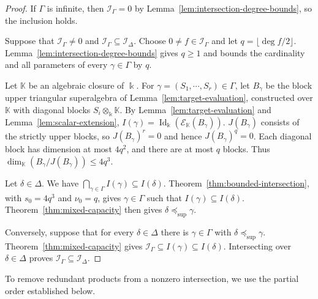 \documentclass[11pt,reqno]{amsart}
\newcommand{\kk}{\Bbbk}
\newcommand{\KK}{\mathbb{K}}
\newcommand{\E}{\mathcal E}
\newcommand{\Id}{\operatorname{Id}}
\theoremstyle{definition}
\theoremstyle{remark}
\numberwithin{equation}{section}
\begin{document}
\begin{proof}
If $\Gamma$ is infinite, then
$\mathcal I_\Gamma=0$ by
Lemma~\ref{lem:intersection-degree-bounds}, so the
inclusion holds.

Suppose that $\mathcal I_\Gamma\ne0$ and
$\mathcal I_\Gamma\subseteq\mathcal I_\Delta$.
Choose $0\ne f\in\mathcal I_\Gamma$ and let
$q=\lfloor\deg f/2\rfloor$.
Lemma~\ref{lem:intersection-degree-bounds} gives $q\geq1$
and bounds the cardinality and all parameters of every
$\gamma\in\Gamma$ by $q$.

Let $\KK$ be an algebraic closure of $\kk$.
For $\gamma=(S_1,\cdots,S_r)\in\Gamma$, let $B_\gamma$
be the block upper triangular superalgebra of
Lemma~\ref{lem:target-evaluation}, constructed over $\KK$
with diagonal blocks $S_i\otimes_\kk \KK$.
By Lemma~\ref{lem:target-evaluation}
and Lemma~\ref{lem:scalar-extension},
$I(\gamma)=\Id_\kk(\E_{\KK}(B_\gamma))$.
 $J(B_\gamma)$ consists of the strictly upper blocks,
so $J(B_\gamma)^r=0$ and hence $J(B_\gamma)^q=0$.
Each diagonal block has dimension at most $4q^2$,
and there are at most $q$ blocks.
Thus $\dim_{\KK}(B_\gamma/J(B_\gamma))\leq4q^3$.

Let $\delta\in\Delta$.
We have $\bigcap_{\gamma\in\Gamma}I(\gamma)
\subseteq I(\delta)$.
Theorem~\ref{thm:bounded-intersection}, with
$s_0=4q^3$ and $\nu_0=q$, gives $\gamma\in\Gamma$
such that $I(\gamma)\subseteq I(\delta)$.
Theorem~\ref{thm:mixed-capacity} then gives
$\delta\preceq_{\mathrm{sup}}\gamma$.

Conversely, suppose that for every $\delta\in\Delta$
there is $\gamma\in\Gamma$ with
$\delta\preceq_{\mathrm{sup}}\gamma$.
Theorem~\ref{thm:mixed-capacity} gives
$\mathcal I_\Gamma\subseteq I(\gamma)\subseteq I(\delta)$.
Intersecting over $\delta\in\Delta$ proves
$\mathcal I_\Gamma\subseteq\mathcal I_\Delta$.
\end{proof}

To remove redundant products from a nonzero intersection,
we use the partial order established below.
\end{document}
